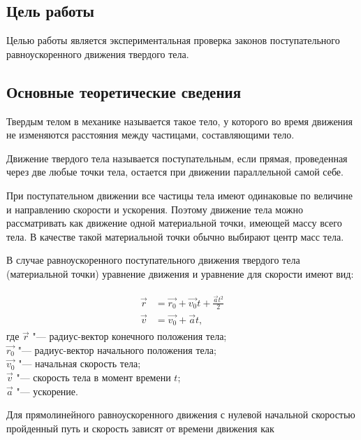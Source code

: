 \documentclass[a4paper, 12pt]{extarticle}
\begin{document}
\MTDTitlePage
\MTDInfoPage

\setcounter{section}{2}

\subsection{Цель работы}
Целью работы является экспериментальная проверка законов поступательного равноускоренного движения твердого тела. 

\subsection{Основные теоретические сведения}
Твердым телом в механике называется такое тело, у которого во время движения не изменяются расстояния между частицами, составляющими тело. 

Движение твердого тела называется поступательным, если прямая, проведенная через две любые точки тела, остается при движении параллельной самой себе.

При поступательном движении все частицы тела имеют одинаковые по величине и направлению скорости и ускорения. Поэтому движение тела можно рассматривать как движение одной материальной точки, имеющей массу всего тела. В качестве такой материальной точки обычно выбирают центр масс тела. 

В случае равноускоренного поступательного движения твердого тела (материальной точки) уравнение движения и уравнение для скорости имеют вид:

\begin{align}
\label{eq:m2-uni-acc-motion}
\begin{split}
\vec{r} &= \vec{r_0} + \vec{v_0}t + \frac{\vec{a}t^2}{2} \\%
\vec{v} &= \vec{v_0} + \vec{a}t,
\end{split}
\end{align}
где $\vec{r}$ "--- радиус-вектор конечного положения тела; \\%
$\vec{r_0}$ "--- радиус-вектор начального положения тела; \\
$\vec{v_0}$ "--- начальная скорость тела; \\
$\vec{v}$ "--- скорость тела в момент времени $t$; \\
$\vec{a}$ "--- ускорение. 

Для прямолинейного равноускоренного движения с нулевой начальной скоростью пройденный путь и скорость зависят от времени движения как %
\end{document}
